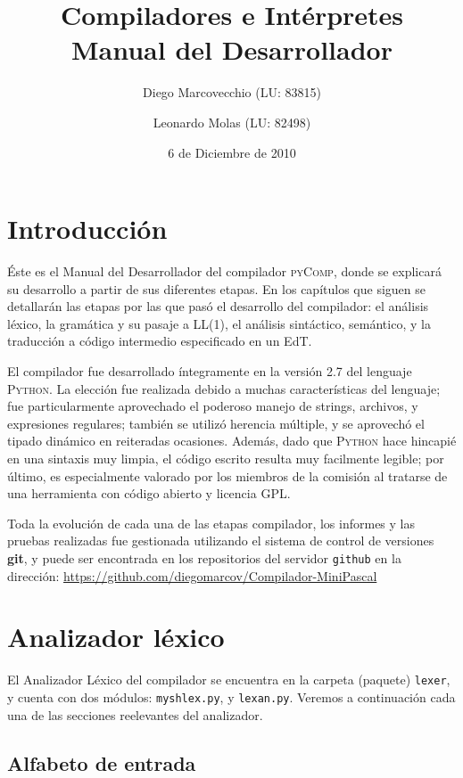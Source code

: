 \documentclass[a4paper,oneside]{report}
\title{Compiladores e Intérpretes\\Manual del Desarrollador}
\author{Diego Marcovecchio (LU: 83815)\and Leonardo Molas (LU: 82498)}
\date{6 de Diciembre de 2010}
\begin{document}
	
\maketitle

\tableofcontents

\chapter*{Introducción} 


Éste es el Manual del Desarrollador del compilador \textsc{pyComp}, donde se explicará su desarrollo a partir de sus diferentes etapas. En los capítulos que siguen se detallarán las etapas por las que pasó el desarrollo del compilador: el análisis léxico, la gramática y su pasaje a LL(1), el análisis sintáctico, semántico, y la traducción a código intermedio especificado en un EdT.

El compilador fue desarrollado íntegramente en la versión 2.7 del lenguaje \textsc{Python}. La elección fue realizada debido a muchas características del lenguaje; fue particularmente aprovechado el poderoso manejo de strings, archivos, y expresiones regulares; también se utilizó herencia múltiple, y se aprovechó el tipado dinámico en reiteradas ocasiones. Además, dado que \textsc{Python} hace hincapié en una sintaxis muy limpia, el código escrito resulta muy facilmente legible; por último, es especialmente valorado por los miembros de la comisión al tratarse de una herramienta con código abierto y licencia GPL.

Toda la evolución de cada una de las etapas compilador, los informes y las pruebas realizadas fue gestionada utilizando el sistema de control de versiones {\bf git}, y puede ser encontrada en los repositorios del servidor \texttt{github} en la dirección: \url{https://github.com/diegomarcov/Compilador-MiniPascal}

\chapter{Analizador léxico}

El Analizador Léxico del compilador se encuentra en la carpeta (paquete) \texttt{lexer}, y cuenta con dos módulos: \texttt{myshlex.py}, y \texttt{lexan.py}. Veremos a continuación cada una de las secciones reelevantes del analizador.

\section{Alfabeto de entrada}
\end{document}
